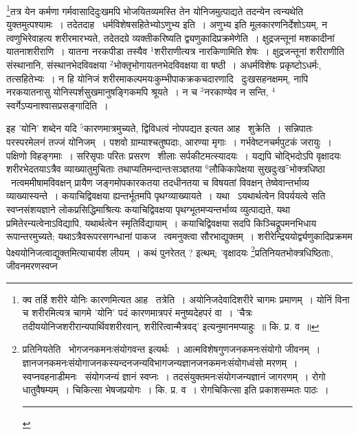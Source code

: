 \documentclass[11pt, openany]{book}
\begin{document}
\newpage
\renewcommand{\thefootnote}{१}\footnote{क्व तर्हि शरीरे योनिः कारणमित्यत आह \textendash\ तत्रेति~। अयोनिजदेवादिशरीरे चागमः प्रमाणम्~। योनिं विना च शरीरमित्यत्र चागमे 'योनि' पदं कारणमात्रपरं मनुष्यदेहपरं वा~। 'चैत्रः तदीययोनिजशरीरान्यपार्थिवशरीरवान्, शरीरित्वान्मैत्रवद्' इत्यनुमानमप्याहुः~॥ कि. प्र. व~॥}तत्र येन कर्मणा गर्मवासादिदुःखमपि भोजयितव्यमस्ति तेन योनिजमुत्पाद्यते तदन्येन त्वन्यथेति युक्तमुत्पश्यामः~। तदेतदाह \textendash\ {\knu धर्मविशेषसहितेभ्योऽणुभ्य} इति~। अणुभ्य इति मूलकारणनिर्देशोऽयम्, न त्वणुभिरेवाहत्य शरीरमारभ्यते, तदेतदग्रे व्यक्तीकरिष्यति {\knu द्व्यणुकादिप्रक्रमेणेति}~। क्षुद्रजन्तूनां मशकादीनां यातनाशरीराणि~। यातना नरकपीडा तस्यैव ${}^1$शरीराणीत्यत्र नारकिणामिति शेषः~। क्षुद्रजन्तूनां शरीराणीति संस्थानानि, संस्थानभेदविवक्षया ${}^2$भोक्तृभोगायतनभेदविवक्षया वा षष्ठी~। अधर्मविशेषः प्रकृष्टोऽधर्मः, तत्सहितेभ्यः~। न हि योनिजं शरीरमाकल्पमयःकुम्भीपाकक्रकचदारणादि \textendash\ दुःखसहनक्षमम्, नापि नरकयातनासु योनिस्पर्शसुखमानुषङ्गिकमपि श्रूयते~। न च ${}^3$नरकाण्येव न सन्ति, ${}^4$स्वर्गेऽप्यनाश्वासप्रसङ्गादिति~।

इह 'योनि' शब्देन यदि ${}^5$कारणमात्रमुच्यते, द्विविधत्वं नोपपद्यत इत्यत आह \textendash\ शुक्रेति~। सन्निपातः परस्परमेलनं तज्जं योनिजम्~। पशवो ग्राम्याश्चतुष्पदाः, आरण्या मृगाः~। गर्भवेष्टनचर्मपुटकं जरायुः~। पक्षिणो विहङ्गमाः~। सरिसृपाः परितः प्रसरण \textendash\ शीलाः सर्पकीटमत्स्यादयः~। यद्यपि चोद्भिदोऽपि वृक्षादयः शरीरभेदतयाऽत्रैव व्याख्यातुमुचिताः तथाप्यतिमन्दान्तःसञ्ज्ञतया ${}^6$लौकिकापेक्षया सुखदुःख$^7$भोक्त्रधिष्ठा \textendash\ नत्वममीषामविवक्षन् प्रायैण जङ्गमोपकारकतया तदधीनतया च विषयतां विवक्षन् तेष्वेवान्तर्भाव्य व्याख्यास्यन्ते~। कयाचिद्विवक्षया ह्यन्तर्भूतमपि पृथग्व्याख्यायते~। यथा \textendash\ ऽयथार्थत्वेन विपर्ययत्वे सति स्वप्नसंशयज्ञाने लोकप्रसिद्धिमाश्रित्यः कयाचिद्विवक्षया पृथग्भूतमप्यन्तर्भाव्य व्युत्पाद्यते, यथा प्रमितेरन्यत्वेनाऽविद्यापि, यथार्थत्वेन स्मृतिर्विद्यायाम्~। कयाचिद्विवक्षया सदपि किञ्चिद्रूपमनभिधाय रूपान्तरमुच्यते; यथाऽत्रैवरूपरसगन्धानां पाकज \textendash\ त्वमनुक्त्वा सौरभाद्युक्तम्~। शरीरेन्द्रिययोर्द्व्यणुकादिप्रक्रमम पेक्ष्ययोनिजत्वाद्युक्तमित्याचार्यश लीयम्~। कथं पुनरेतत् ? इत्थम्; 'वृक्षादयः \renewcommand{\thefootnote}{२}\footnote{प्रतिनियतेति \textendash\ भोगजनकमनःसंयोगवन्त इत्यर्थः~। आत्मविशेषगुणजनकमनःसंयोगो जीवनम्~। ज्ञानजनकमनःसंयोगाजनकस्यन्दनजन्यविभागजन्यज्ञानजनकमनःसंयोगध्वंसो मरणम्~। स्वप्नवहनाडीमनः \textendash\ संयोगजन्यं ज्ञानं स्वप्नः~। तदसंयुक्तमनःसंयोगजन्यज्ञानं जागरणम्~। रोगो धातुवैषम्यम्~। चिकित्सा भेषजप्रयोगः~। कि. प्र. व~। रोगचिकित्सा इति प्रकाशसम्मतः पाठः~।\\ \rule{0.4\linewidth}{0.5pt}}प्रतिनियतभोक्त्रधिष्ठिताः, जीवनमरणस्वप्न
\end{document}
